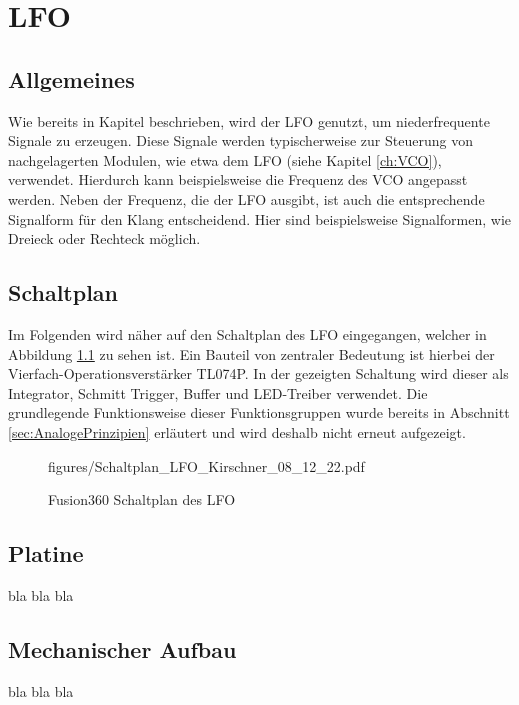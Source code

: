 \chapter{LFO}
\label{ch:LFO}

\section{Allgemeines}
Wie bereits in Kapitel \label{ch:concept} beschrieben, wird der LFO genutzt, um niederfrequente Signale zu erzeugen. 
Diese Signale werden typischerweise zur Steuerung von nachgelagerten Modulen, wie etwa dem LFO (siehe Kapitel \ref{ch:VCO}), verwendet.
Hierdurch kann beispielsweise die Frequenz des VCO angepasst werden. 
Neben der Frequenz, die der LFO ausgibt, ist auch die entsprechende Signalform für den Klang entscheidend. Hier sind beispielsweise Signalformen, wie Dreieck oder Rechteck möglich.

\section{Schaltplan}
Im Folgenden wird näher auf den Schaltplan des LFO eingegangen, welcher in Abbildung \ref{fig:LFO_Stromlaufplan} zu sehen ist. 
Ein Bauteil von zentraler Bedeutung ist hierbei der Vierfach-Operationsverstärker TL074P. In der gezeigten Schaltung wird dieser als Integrator, Schmitt Trigger, Buffer und LED-Treiber verwendet.
Die grundlegende Funktionsweise dieser Funktionsgruppen wurde bereits in Abschnitt \ref{sec:AnalogePrinzipien} erläutert und wird deshalb nicht erneut aufgezeigt.

\newpage
\begin{figure}[h]
\centering
 {figures/Schaltplan_LFO_Kirschner_08_12_22.pdf}
\caption{Fusion360 Schaltplan des LFO}
\label{fig:LFO_Stromlaufplan}
\end{figure}
 
\newpage

\section{Platine}
bla bla bla

\section{Mechanischer Aufbau}
bla bla bla